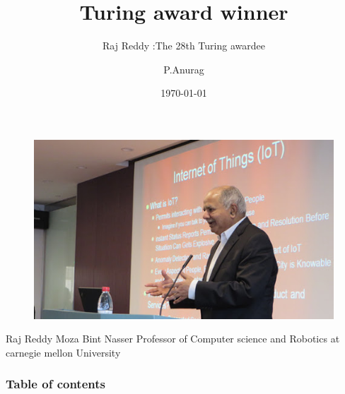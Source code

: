 \documentclass{beamer}
\title{Turing award winner}
\subtitle{Raj Reddy :The 28th Turing awardee}
\author{P.Anurag}
\institute{SCIS University of Hyderabad}
\date{\today}
\begin{document}
 
\maketitle
 
 
\begin{frame}
\begin{figure}
 \centering
 \includegraphics[scale=0.5]{raj1.jpg}
\end{figure} 

\begin{block}{}
 Raj Reddy  Moza Bint Nasser Professor of Computer science and Robotics at 
 carnegie mellon University
\end{block}
\end{frame}

 
 
\begin{frame}
  \frametitle{Table of contents}
  \tableofcontents

\end{frame}
\end{document}
